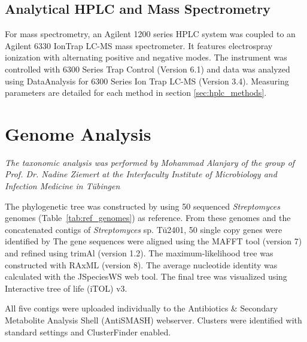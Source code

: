 
\subsection{Analytical HPLC and Mass Spectrometry} %
\label{sub:analytical_hplc_and_mass_spectrometry}

For mass spectrometry, an Agilent 1200 series HPLC system was coupled to an Agilent 6330 IonTrap LC-MS mass spectrometer.
It features electrospray ionization with alternating positive and negative modes.
The instrument was controlled with 6300 Series Trap Control (Version 6.1) and data was analyzed using DataAnalysis for 6300 Series Ion Trap LC-MS (Version 3.4).
Measuring parameters are detailed for each method in section \ref{sec:hplc_methods}.


\section{Genome Analysis} %
\label{sec:genome_analysis}

\emph{The taxonomic analysis was performed by Mohammad Alanjary of the group of Prof. Dr. Nadine Ziemert at the Interfaculty Institute of Microbiology and Infection Medicine in Tübingen}

The phylogenetic tree was constructed by using 50 sequenced \textit{Streptomyces} genomes (Table~\ref{tab:ref_genomes}) as reference.
From these genomes and the concatenated contigs of \textit{Streptomyces} sp. Tü2401, 50 single copy genes were identified by
The gene sequences were aligned using the MAFFT tool (version 7) and refined using trimAl (version 1.2).\autocite{Katoh2017,Kuraku2013,Capella-Gutierrez2009}
The maximum-likelihood tree was constructed with RAxML (version 8).\autocite{Stamatakis2014}
The average nucleotide identity was calculated with the JSpeciesWS web tool.\autocite{Richter2017}
The final tree was visualized using Interactive tree of life (iTOL) v3.\autocite{Letunic2016}

All five contigs were uploaded individually to the Antibiotics \& Secondary Metabolite Analysis Shell (AntiSMASH) webserver.\autocite{Weber2015,Blin2013,Medema2011}
Clusters were identified with standard settings and ClusterFinder enabled.

